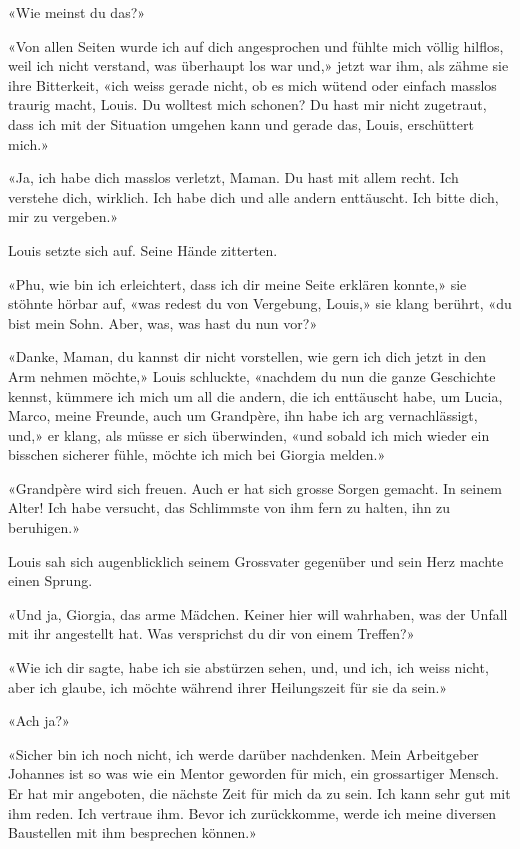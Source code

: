 «Wie meinst du das?»

«Von allen Seiten wurde ich auf dich angesprochen und fühlte mich völlig
hilflos, weil ich nicht verstand, was überhaupt los war und,» jetzt war
ihm, als zähme sie ihre Bitterkeit, «ich weiss gerade nicht, ob es mich
wütend oder einfach masslos traurig macht, Louis. Du wolltest mich
schonen? Du hast mir nicht zugetraut, dass ich mit der Situation umgehen
kann und gerade das, Louis, erschüttert mich.»

«Ja, ich habe dich masslos verletzt, Maman. Du hast mit allem recht. Ich
verstehe dich, wirklich. Ich habe dich und alle andern enttäuscht. Ich
bitte dich, mir zu vergeben.»

Louis setzte sich auf. Seine Hände zitterten.

«Phu, wie bin ich erleichtert, dass ich dir meine Seite erklären
konnte,» sie stöhnte hörbar auf, «was redest du von Vergebung, Louis,»
sie klang berührt, «du bist mein Sohn. Aber, was, was hast du nun vor?»

«Danke, Maman, du kannst dir nicht vorstellen, wie gern ich dich jetzt
in den Arm nehmen möchte,» Louis schluckte, «nachdem du nun die ganze
Geschichte kennst, kümmere ich mich um all die andern, die ich
enttäuscht habe, um Lucia, Marco, meine Freunde, auch um Grandpère, ihn
habe ich arg vernachlässigt, und,» er klang, als müsse er sich
überwinden, «und sobald ich mich wieder ein bisschen sicherer fühle,
möchte ich mich bei Giorgia melden.»

«Grandpère wird sich freuen. Auch er hat sich grosse Sorgen gemacht. In
seinem Alter! Ich habe versucht, das Schlimmste von ihm fern zu halten,
ihn zu beruhigen.»

Louis sah sich augenblicklich seinem Grossvater gegenüber und sein Herz
machte einen Sprung.

«Und ja, Giorgia, das arme Mädchen. Keiner hier will wahrhaben, was der
Unfall mit ihr angestellt hat. Was versprichst du dir von einem
Treffen?»

«Wie ich dir sagte, habe ich sie abstürzen sehen, und, und ich, ich
weiss nicht, aber ich glaube, ich möchte während ihrer Heilungszeit für
sie da sein.»

«Ach ja?»

«Sicher bin ich noch nicht, ich werde darüber nachdenken. Mein
Arbeitgeber Johannes ist so was wie ein Mentor geworden für mich, ein
grossartiger Mensch. Er hat mir angeboten, die nächste Zeit für mich da
zu sein. Ich kann sehr gut mit ihm reden. Ich vertraue ihm. Bevor ich
zurückkomme, werde ich meine diversen Baustellen mit ihm besprechen
können.»

